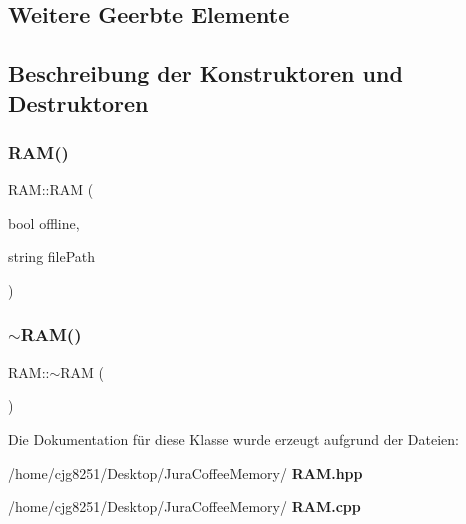 \subsection*{Weitere Geerbte Elemente}


\subsection{Beschreibung der Konstruktoren und Destruktoren}
\mbox{\label{class_r_a_m_ad922e92719a50987d398e771cf8cf88b}} 
\subsubsection{R\+A\+M()}
{\footnotesize\ttfamily R\+A\+M\+::\+R\+AM (\begin{DoxyParamCaption}\item[{bool}]{offline,  }\item[{string}]{file\+Path }\end{DoxyParamCaption})}

\mbox{\label{class_r_a_m_ac884b3e9ee3c3d95ebcd7b6ed9851da3}} 
\subsubsection{$\sim$\+R\+A\+M()}
{\footnotesize\ttfamily R\+A\+M\+::$\sim$\+R\+AM (\begin{DoxyParamCaption}{ }\end{DoxyParamCaption})\hspace{0.3cm}{\ttfamily [virtual]}}



Die Dokumentation für diese Klasse wurde erzeugt aufgrund der Dateien\+:\begin{DoxyCompactItemize}
\item 
/home/cjg8251/\+Desktop/\+Jura\+Coffee\+Memory/\textbf{ R\+A\+M.\+hpp}\item 
/home/cjg8251/\+Desktop/\+Jura\+Coffee\+Memory/\textbf{ R\+A\+M.\+cpp}\end{DoxyCompactItemize}
